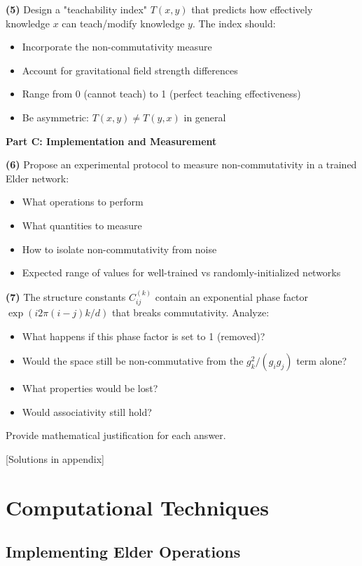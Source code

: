 \begin{critical}
\textbf{(5)} Design a "teachability index" $T(x, y)$ that predicts how effectively knowledge $x$ can teach/modify knowledge $y$. The index should:
\begin{itemize}
\item Incorporate the non-commutativity measure
\item Account for gravitational field strength differences
\item Range from 0 (cannot teach) to 1 (perfect teaching effectiveness)
\item Be asymmetric: $T(x,y) \neq T(y,x)$ in general
\end{itemize}

\textbf{Part C: Implementation and Measurement}

\textbf{(6)} Propose an experimental protocol to measure non-commutativity in a trained Elder network:
\begin{itemize}
\item What operations to perform
\item What quantities to measure
\item How to isolate non-commutativity from noise
\item Expected range of values for well-trained vs randomly-initialized networks
\end{itemize}

\textbf{(7)} The structure constants $C_{ij}^{(k)}$ contain an exponential phase factor $\exp(i2\pi(i-j)k/d)$ that breaks commutativity. Analyze:
\begin{itemize}
\item What happens if this phase factor is set to 1 (removed)?
\item Would the space still be non-commutative from the $g_k^2/(g_ig_j)$ term alone?
\item What properties would be lost?
\item Would associativity still hold?
\end{itemize}

Provide mathematical justification for each answer.
\end{critical}

[Solutions in appendix]

\chapter{Computational Techniques}

\section{Implementing Elder Operations}

